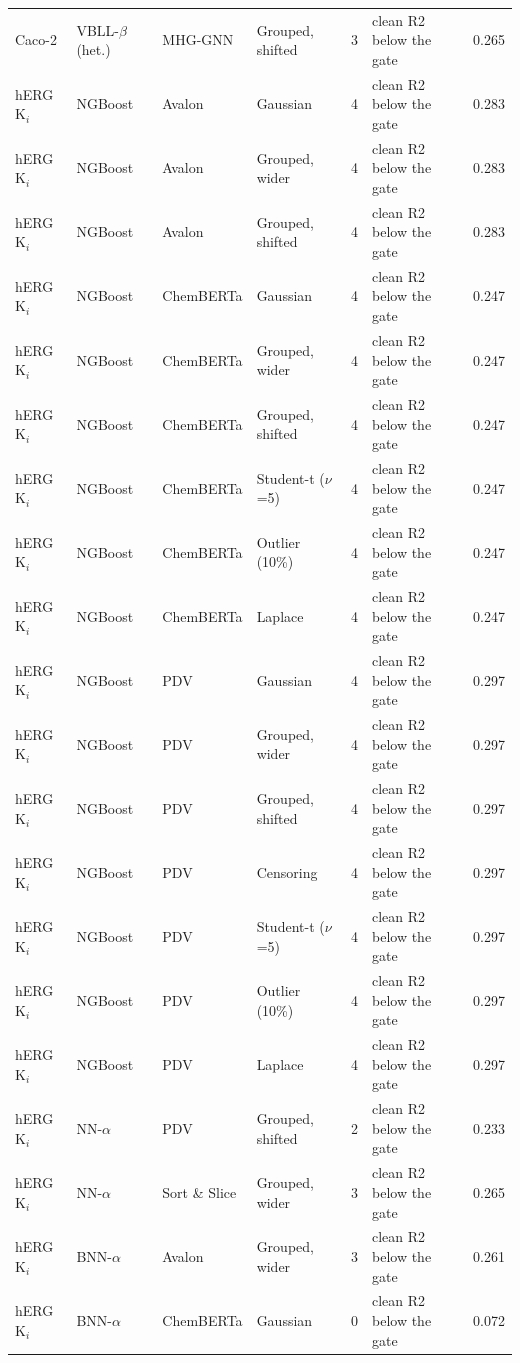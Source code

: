 {\begin{longtable}{llllcll}
Caco-2 & VBLL-$\beta$ (het.) & MHG-GNN & Grouped, shifted & 3 & clean R2 below the gate & 0.265 \\
hERG K$_i$ & NGBoost & Avalon & Gaussian & 4 & clean R2 below the gate & 0.283 \\
hERG K$_i$ & NGBoost & Avalon & Grouped, wider & 4 & clean R2 below the gate & 0.283 \\
hERG K$_i$ & NGBoost & Avalon & Grouped, shifted & 4 & clean R2 below the gate & 0.283 \\
hERG K$_i$ & NGBoost & ChemBERTa & Gaussian & 4 & clean R2 below the gate & 0.247 \\
hERG K$_i$ & NGBoost & ChemBERTa & Grouped, wider & 4 & clean R2 below the gate & 0.247 \\
hERG K$_i$ & NGBoost & ChemBERTa & Grouped, shifted & 4 & clean R2 below the gate & 0.247 \\
hERG K$_i$ & NGBoost & ChemBERTa & Student-t ($\nu$=5) & 4 & clean R2 below the gate & 0.247 \\
hERG K$_i$ & NGBoost & ChemBERTa & Outlier (10\%) & 4 & clean R2 below the gate & 0.247 \\
hERG K$_i$ & NGBoost & ChemBERTa & Laplace & 4 & clean R2 below the gate & 0.247 \\
hERG K$_i$ & NGBoost & PDV & Gaussian & 4 & clean R2 below the gate & 0.297 \\
hERG K$_i$ & NGBoost & PDV & Grouped, wider & 4 & clean R2 below the gate & 0.297 \\
hERG K$_i$ & NGBoost & PDV & Grouped, shifted & 4 & clean R2 below the gate & 0.297 \\
hERG K$_i$ & NGBoost & PDV & Censoring & 4 & clean R2 below the gate & 0.297 \\
hERG K$_i$ & NGBoost & PDV & Student-t ($\nu$=5) & 4 & clean R2 below the gate & 0.297 \\
hERG K$_i$ & NGBoost & PDV & Outlier (10\%) & 4 & clean R2 below the gate & 0.297 \\
hERG K$_i$ & NGBoost & PDV & Laplace & 4 & clean R2 below the gate & 0.297 \\
hERG K$_i$ & NN-$\alpha$ & PDV & Grouped, shifted & 2 & clean R2 below the gate & 0.233 \\
hERG K$_i$ & NN-$\alpha$ & Sort \& Slice & Grouped, wider & 3 & clean R2 below the gate & 0.265 \\
hERG K$_i$ & BNN-$\alpha$ & Avalon & Grouped, wider & 3 & clean R2 below the gate & 0.261 \\
hERG K$_i$ & BNN-$\alpha$ & ChemBERTa & Gaussian & 0 & clean R2 below the gate & 0.072 \\

\end{longtable}}
